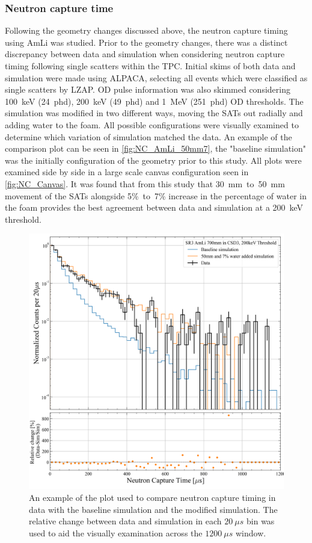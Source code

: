 \subsubsection{Neutron capture time}
Following the geometry changes discussed above, the neutron capture timing using AmLi was studied. Prior to the geometry changes, there was a distinct discrepancy between data and simulation when considering neutron capture timing following single scatters within the TPC. Initial skims of both data and simulation were made using ALPACA, selecting all events which were classified as single scatters by LZAP. OD pulse information was also skimmed considering 100~keV (24~phd), 200~keV (49~phd) and 1~MeV (251~phd) OD thresholds.
The simulation was modified in two different ways, moving the SATs out radially and adding water to the foam. All possible configurations were visually examined to determine which variation of simulation matched the data. An example of the comparison plot can be seen in \autoref{fig:NC_AmLi_50mm7}, the "baseline simulation" was the initially configuration of the geometry prior to this study. All plots were examined side by side in a large scale canvas configuration seen in \autoref{fig:NC_Canvas}. It was found that from this study that 30~mm~to~50~mm movement of the SATs alongside 5\%~to~7\% increase in the percentage of water in the foam provides the best agreement between data and simulation at a 200~keV threshold.
\begin{figure}
	\centering
	\includegraphics[width=0.8\linewidth]{figures/VetoEfficiency/movedSAT50mm_7percentWater_AmLi_CSD3_Z700mm_200keV_Ratio.png}
	\caption{An example of the plot used to compare neutron capture timing in data with the baseline simulation and the modified simulation. The relative change between data and simulation in each $20~\mu s$ bin was used to aid the visually examination across the $1200~\mu s$ window.}
	\label{fig:NC_AmLi_50mm7}
\end{figure}
